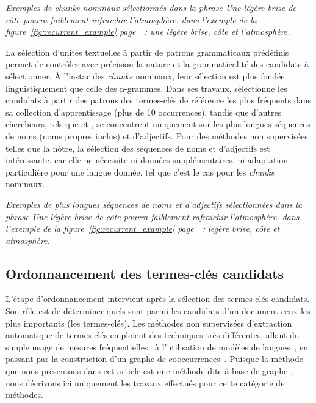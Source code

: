     \textit{Exemples de \textit{chunks} nominaux sélectionnés dans la phrase
    \og{}Une légère brise de côte pourra faiblement rafraichir
    l'atmosphère.\fg{} dans l'exemple de la figure~\ref{fig:recurrent_example}
    page~\pageref{fig:recurrent_example}~: \og{}une légère brise\fg{},
    \og{}côte\fg{} et \og{}l'atmosphère\fg{}.}

    La sélection d'unités textuelles à partir de patrons grammaticaux prédéfinis
    permet de contrôler avec précision la nature et la grammaticalité des
    candidats à sélectionner. À l'instar des \textit{chunks} nominaux, leur
    sélection est plus fondée linguistiquement que celle des n-grammes. Dans ses
    travaux,  sélectionne les candidats à
    partir des patrons des termes-clés de référence les plus fréquents dans sa
    collection d'apprentissage (plus de 10 occurrences), tandis que d'autres
    chercheurs, tels que  et
    , se concentrent uniquement sur les plus
    longues séquences de noms (noms propres inclus) et d'adjectifs. Pour des
    méthodes non supervisées telles que la nôtre, la sélection des séquences de
    noms et d'adjectifs est intéressante, car elle ne nécessite ni données
    supplémentaires, ni adaptation particulière pour une langue donnée, tel que
    c'est le cas pour les \textit{chunks} nominaux.

    \textit{Exemples de plus longues séquences de noms et d'adjectifs
    sélectionnées dans la phrase \og{}Une légère brise de côte pourra faiblement
    rafraichir l'atmosphère.\fg{} dans l'exemple de la
    figure~\ref{fig:recurrent_example} page~\pageref{fig:recurrent_example}~:
    \og{}légère brise\fg{}, \og{}côte\fg{} et \og{}atmosphère\fg{}.}

  \subsection{Ordonnancement des termes-clés candidats}
  \label{subsec:ordonnancement_des_termes_cles_candidats}
    L'étape d'ordonnancement intervient après la sélection des termes-clés
    candidats. Son rôle est de déterminer quels sont parmi les candidats d'un
    document ceux les plus importants (les termes-clés).
    Les méthodes non supervisées d'extraction automatique de termes-clés
    emploient des techniques très différentes, allant du simple usage de mesures
    fréquentielles~\cite{paukkeri2010likey} à l'utilisation de modèles de
    langues~\cite{tomokiyo2003languagemodel}, en passant par la construction
    d'un graphe de cooccurrences~\cite{mihalcea2004textrank}. Puisque la méthode
    que nous présentons dans cet article est une méthode dite \og à base de
    graphe~\fg, nous décrivons ici uniquement les travaux effectués pour cette
    catégorie de méthodes.

